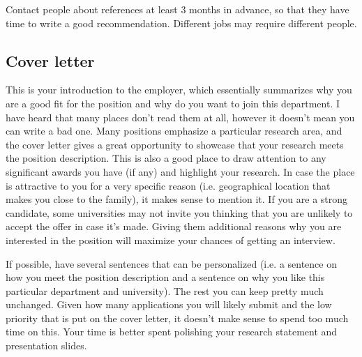 \documentclass{article}
\begin{document}
Contact people about references at least 3 months in advance, so that they have time to write a good recommendation. Different jobs may require different people. 


\subsection{Cover letter}
This is your introduction to the employer, which essentially summarizes why you are a good fit for the position and why do you want to join this department. I have heard that many places don't read them at all, however it doesn't mean you can write a bad one. Many positions emphasize a particular research area, and the cover letter gives a great opportunity to showcase that your research meets the position description. This is also a good place to draw attention to any significant awards you have (if any) and highlight your research. In case the place is attractive to you for a very specific reason (i.e. geographical location that makes you close to the family), it makes sense to mention it. If you are a strong candidate, some universities may not invite you thinking that you are unlikely to accept the offer in case it's made. Giving them additional reasons why you are interested in the position will maximize your chances of getting an interview.

If possible, have several sentences that can be personalized (i.e. a sentence on how you meet the position description and a sentence on why you like this particular department and university). The rest you can keep pretty much unchanged. Given how many applications you will likely submit and the low priority that is put on the cover letter, it doesn't make sense to spend too much time on this. Your time is better spent polishing your research statement and presentation slides.
\end{document}
